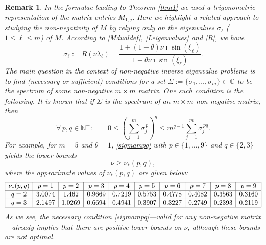 \documentclass[a4paper]{article}
\newtheorem{remark}{Remark}
\newcommand{\te}{\theta}
\newcommand{\nplus}{\mathbb{N}^+}
\begin{document}
\begin{remark} 
In the formulae leading to Theorem \ref{thm1} we used a trigonometric representation of the matrix 
\emph{entries} $M_{1,j}$. Here we highlight a related approach to studying the non-negativity of $M$ by
relying only on the \emph{eigenvalues} $\sigma_\ell$ ($1\le \ell\le m$) of $M$. According to
\eqref{Mdualdef}, \eqref{Leigenvalues} and \eqref{R}, we have
\[
\sigma_\ell:=R(\nu\lambda_\ell)=\frac{1+ (1-\theta )\nu \imath \sin \left(\xi _\ell\right)}{1- \theta\nu \imath  \sin \left(\xi _\ell\right)}.
\]
The main question in the context of \emph{non-negative inverse eigenvalue problems} is to 
find (necessary or sufficient) conditions for a set $\Sigma:=\{\sigma_1,\ldots,\sigma_m\}\subset\mathbb{C}$ to be the spectrum of \emph{some} non-negative $m \times m$ matrix.
One such condition is the following. It is known \cite[Chapter 4]{nonnegmatr} that if $\Sigma$ is the spectrum of 
an $m \times m$ non-negative matrix, then 
\begin{equation}\label{sigmampq}
\forall\, p, q \in\nplus:\quad\quad 0\le \left(\sum_{j=1}^m \sigma_j^{\,p}\right)^q\le m^{q-1} \sum_{j=1}^m \sigma_j^{\,p q}.
\end{equation}
For example, for $m=5$ and $\te=1$, \eqref{sigmampq} with  $p\in\{1,\ldots,9\}$ and $q\in\{2,3\}$ yields the lower bounds
\begin{equation}\label{nustartpq}
\nu\ge \nu_{*}(p,q),
\end{equation}
where the approximate values of $\nu_{*}(p,q)$ are given below:
\[
\begin{array}{|c|c|c|c|c|c|c|c|c|c|}
\hline
\nu_{*}(p,q) & p=1 & p=2 & p=3 & p=4 & p=5 & p=6 & p=7 & p=8 & p=9 \\
\hline
q=2 & 3.0074 & 1.462 & 0.9669 & 0.7219 & 0.5753 & 0.4778 & 0.4082 & 0.3563 & 0.3160 \\
\hline
q=3 & 2.1497 & 1.0269 & 0.6694  & 0.4941 & 0.3907 & 0.3227  & 0.2749  & 0.2393  &  0.2119 \\
\hline
\end{array}
\]
As we see, the necessary condition \eqref{sigmampq}---valid for \emph{any} non-negative matrix---already 
implies that there are positive \emph{lower} bounds on $\nu$, although these bounds are not optimal. 

\end{remark}
\end{document}
